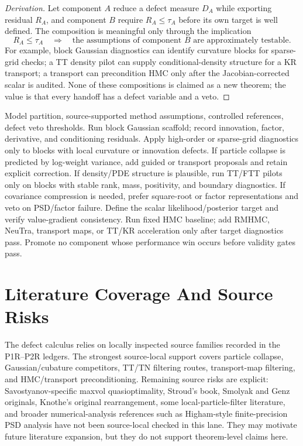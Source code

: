 \begin{proof}[Derivation]
Let component \(A\) reduce a defect measure \(D_A\) while exporting residual
\(R_A\), and component \(B\) require \(R_A\le\tau_A\) before its own target is
well defined.  The composition is meaningful only through the implication
\[
  R_A\le\tau_A \quad\Longrightarrow\quad
  \text{the assumptions of component } B \text{ are approximately testable}.
\]
For example, block Gaussian diagnostics can identify curvature blocks for
sparse-grid checks; a TT density pilot can supply conditional-density structure
for a KR transport; a transport can precondition HMC only after the
Jacobian-corrected scalar is audited.  None of these compositions is claimed as
a new theorem; the value is that every handoff has a defect variable and a
veto.
\end{proof}

\begin{algorithm}
\caption{Defect-first high-dimensional filtering synthesis}
\label{alg:bf-hd-defect-synthesis}
\begin{algorithmic}[1]
\Require Model partition, source-supported method assumptions, controlled
  references, defect veto thresholds.
\State Run block Gaussian scaffold; record innovation, factor, derivative, and
  conditioning residuals.
\State Apply high-order or sparse-grid diagnostics only to blocks with local
  curvature or innovation defects.
\State If particle collapse is predicted by log-weight variance, add guided or
  transport proposals and retain explicit correction.
\State If density/PDE structure is plausible, run TT/FTT pilots only on blocks
  with stable rank, mass, positivity, and boundary diagnostics.
\State If covariance compression is needed, prefer square-root or factor
  representations and veto on PSD/factor failure.
\State Define the scalar likelihood/posterior target and verify value-gradient
  consistency.
\State Run fixed HMC baseline; add RMHMC, NeuTra, transport maps, or TT/KR
  acceleration only after target diagnostics pass.
\State Promote no component whose performance win occurs before validity
  gates pass.
\end{algorithmic}
\end{algorithm}

\section{Literature Coverage And Source Risks}
\label{sec:bf-hd-source-risks}

The defect calculus relies on locally inspected source families recorded in the
P1R--P2R ledgers.  The strongest source-local support covers particle collapse,
Gaussian/cubature competitors, TT/TN filtering routes, transport-map filtering,
and HMC/transport preconditioning.  Remaining source risks are explicit:
Savostyanov-specific maxvol quasioptimality, Stroud's book, Smolyak and Genz
originals, Knothe's original rearrangement, some local-particle-filter
literature, and broader numerical-analysis references such as Higham-style
finite-precision PSD analysis have not been source-local checked in this lane.
They may motivate future literature expansion, but they do not support
theorem-level claims here.

